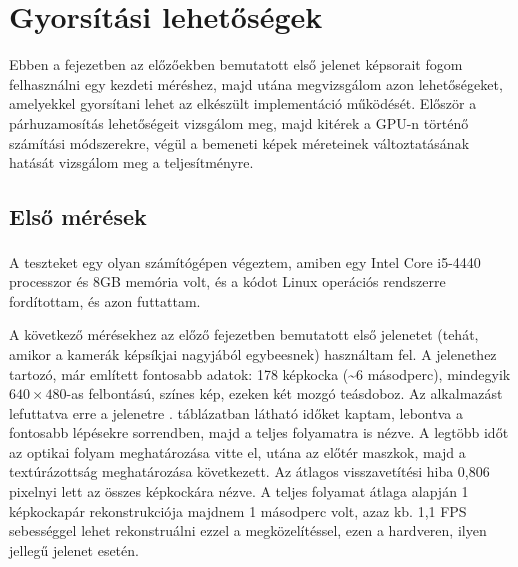 \chapter{Gyorsítási lehetőségek}

Ebben a fejezetben az előzőekben bemutatott első jelenet képsorait fogom felhasználni egy kezdeti méréshez, majd utána megvizsgálom azon lehetőségeket, amelyekkel gyorsítani lehet az elkészült implementáció működését. Először a párhuzamosítás lehetőségeit vizsgálom meg, majd kitérek a GPU-n történő számítási módszerekre, végül a bemeneti képek méreteinek változtatásának hatását vizsgálom meg a teljesítményre.

\section{Első mérések}

A teszteket egy olyan számítógépen végeztem, amiben egy Intel\textsuperscript{\textregistered} Core\texttrademark{} i5-4440 processzor és 8GB memória volt, és a kódot Linux operációs rendszerre fordítottam, és azon futtattam.

A következő mérésekhez az előző fejezetben bemutatott első jelenetet (tehát, amikor a kamerák képsíkjai nagyjából egybeesnek) használtam fel. A jelenethez tartozó, már említett fontosabb adatok: 178 képkocka (\textasciitilde 6 másodperc), mindegyik $640\times 480$-as felbontású, színes kép, ezeken két mozgó teásdoboz. Az alkalmazást lefuttatva erre a jelenetre . táblázatban látható időket kaptam, lebontva a fontosabb lépésekre sorrendben, majd a teljes folyamatra is nézve. A legtöbb időt az optikai folyam meghatározása vitte el, utána az előtér maszkok, majd a textúrázottság meghatározása következett. Az átlagos visszavetítési hiba 0,806 pixelnyi lett az összes képkockára nézve. A teljes folyamat átlaga alapján 1 képkockapár rekonstrukciója majdnem 1 másodperc volt, azaz kb. 1,1 FPS sebességgel lehet rekonstruálni ezzel a megközelítéssel, ezen a hardveren, ilyen jellegű jelenet esetén.

